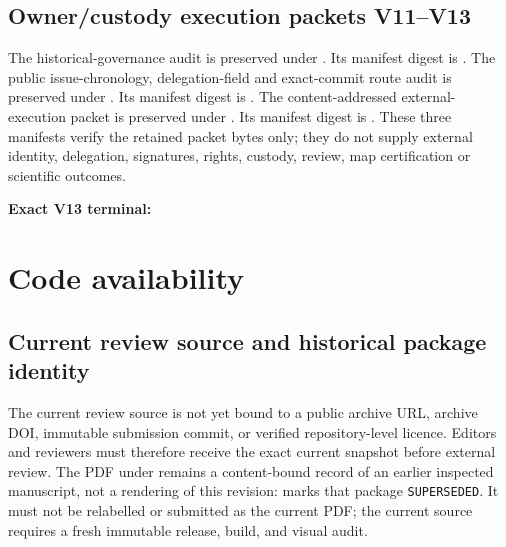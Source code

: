 \subsection{Owner/custody execution packets V11--V13}
The historical-governance audit is preserved under
.
Its  manifest digest is
.
The public issue-chronology, delegation-field and exact-commit route audit is
preserved under
.
Its manifest digest is
.
The content-addressed external-execution packet is preserved under
.
Its manifest digest is
.
These three manifests verify the retained packet bytes only; they do not supply
external identity, delegation, signatures, rights, custody, review, map
certification or scientific outcomes.
\begin{center}
\begin{minipage}{0.96\linewidth}
\textbf{Exact V13 terminal:}\par
\small\raggedright
{}
\end{minipage}
\end{center}

\section{Code availability}

\subsection{Current review source and historical package identity}
The current review source is not yet bound to a public archive URL, archive
DOI, immutable submission commit, or verified repository-level licence. Editors
and reviewers must therefore receive the exact current snapshot before external
review. The PDF under  remains a content-bound record of
an earlier inspected manuscript, not a rendering of this revision:
 marks that package
\texttt{SUPERSEDED}. It must not be relabelled or submitted as the current PDF;
the current source requires a fresh immutable release, build, and visual audit.

